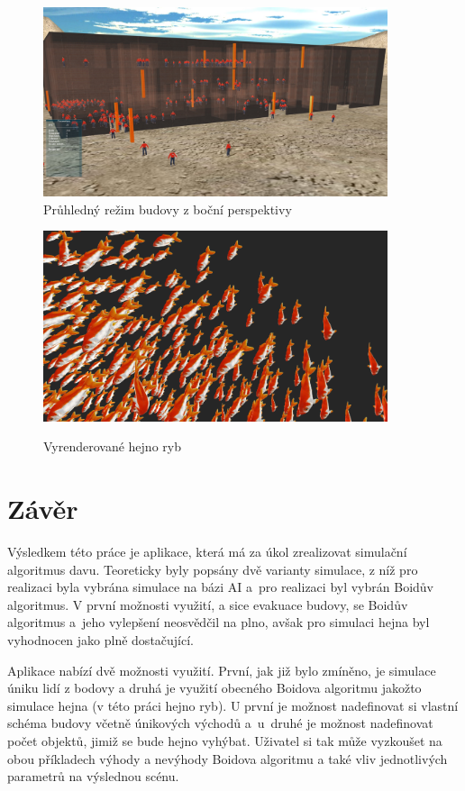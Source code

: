\documentclass[czech,public,dept460,male,cpdeclaration]{diploma}
\begin{document}
\begin{figure}[H]\centering\includegraphics[width=0.9\textwidth]{Figures/screen7.jpg}
	\caption{Průhledný režim budovy z boční perspektivy}
\end{figure}

\begin{figure}[H]\centering\includegraphics[width=0.9\textwidth]{Figures/fish6.jpg}\label{fig:hejnoRyb}
	\caption{Vyrenderované hejno ryb}\label{fig:hejnoRyb}
\end{figure}

\section{Závěr}
Výsledkem této práce je aplikace, která má za úkol zrealizovat simulační algoritmus davu. Teoreticky byly popsány dvě varianty simulace, z níž pro realizaci byla vybrána simulace na bázi AI a~pro realizaci byl vybrán Boidův algoritmus. V první možnosti využití, a sice evakuace budovy, se Boidův algoritmus a~jeho vylepšení neosvědčil na plno, avšak pro simulaci hejna byl vyhodnocen jako plně dostačující.

Aplikace nabízí dvě možnosti využití. První, jak již bylo zmíněno, je simulace úniku lidí z bodovy a druhá je využití obecného Boidova algoritmu jakožto simulace hejna (v této práci hejno ryb). U první je možnost nadefinovat si vlastní schéma budovy včetně únikových východů a~u~druhé je možnost nadefinovat počet objektů, jimiž se bude hejno vyhýbat. Uživatel si tak může vyzkoušet na obou příkladech výhody a nevýhody Boidova algoritmu a také vliv jednotlivých parametrů na výslednou scénu.
\end{document}
